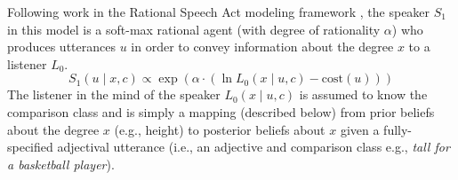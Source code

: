 \documentclass[doc, floatsintext]{apa6}
\newcommand{\ndg}[1]{\textcolor{Green}{[ndg: #1]}}
\begin{document}
Following work in the Rational Speech Act modeling framework \cite{Frank2012, Goodman2016, scontras2017probabilistic}, the speaker $S_1$ in this model is a soft-max rational agent (with degree of rationality $\alpha$) who produces utterances $u$ in order to convey information about the degree $x$ to a listener $L_0$.
%
\begin{equation}
S_1(u \mid x, c) \propto \exp{(\alpha \cdot (\ln L_{0}(x \mid u, c) - \text{cost}(u) ))}\label{eq:S1}
\end{equation}
%
%
%
%
%
%
%
The listener in the mind of the speaker $L_{0}(x \mid u, c)$ is assumed to know the comparison class and is simply a mapping (described below) from prior beliefs about the degree $x$ (e.g., height) to posterior beliefs about $x$ given a fully-specified adjectival utterance (i.e., an adjective and comparison class e.g., \emph{tall for a basketball player}).
\end{document}
